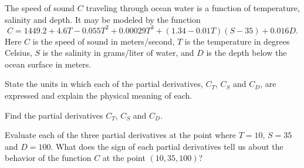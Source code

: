 \begin{activity} \label{A:10.2.11} 
The speed of sound $C$ traveling through ocean water is a function of
temperature, salinity and depth.  It may be modeled by the function
$$
C=1449.2+4.6T-0.055T^2+0.00029T^3+(1.34-0.01T)(S-35)+0.016D.
$$
Here $C$ is the speed of sound in meters/second, $T$ is the
temperature in degrees Celsius, $S$ is the salinity in grams/liter of
water, and $D$ is the depth below the ocean surface in meters.

\ba
\item State the units in which each of the partial derivatives,
  $C_T$, $C_S$ and $C_D$, are expressed and explain the physical
  meaning of each. 

\item Find the partial derivatives $C_T$, $C_S$ and $C_D$.  

\item Evaluate each of the three partial derivatives at the point where $T=10$, $S=35$ and
  $D=100$.  What does the sign of each partial derivatives tell us about the behavior of the function $C$ at the point $(10,35, 100)$?

  \ea


\end{activity}

